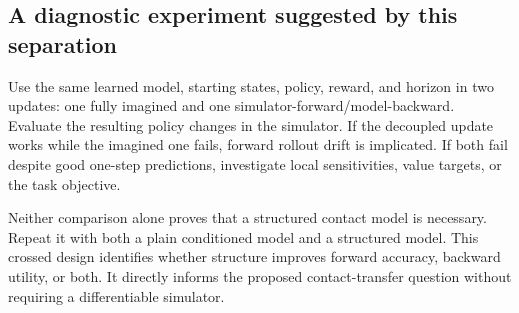 \subsection{A diagnostic experiment suggested by this separation}
Use the same learned model, starting states, policy, reward, and horizon in
two updates: one fully imagined and one simulator-forward/model-backward.
Evaluate the resulting policy changes in the simulator. If the decoupled update
works while the imagined one fails, forward rollout drift is implicated. If both
fail despite good one-step predictions, investigate local sensitivities, value
targets, or the task objective.

Neither comparison alone proves that a structured contact model is necessary.
Repeat it with both a plain conditioned model and a structured model. This
crossed design identifies whether structure improves forward accuracy, backward
utility, or both. It directly informs the proposed contact-transfer question
without requiring a differentiable simulator.
